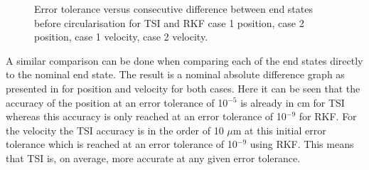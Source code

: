 \begin{figure}[H]
\caption{Error tolerance versus consecutive difference between end states before circularisation for \ac{TSI} and \ac{RKF} \protect{} case 1 position, \protect{} case 2 position, \protect{} case 1 velocity, \protect{} case 2 velocity. } 
\label{fig:errorToleranceVsConsecutiveDifferenceCase1RKFTSIpositionSmall} 
\end{figure} 

\noindent
A similar comparison can be done when comparing each of the end states directly to the nominal end state. The result is a nominal absolute difference graph as presented in  for position and velocity for both cases. Here it can be seen that the accuracy of the position at an error tolerance of 10$^{-5}$ is already in cm for \ac{TSI} whereas this accuracy is only reached at an error tolerance of 10$^{-9}$ for \ac{RKF}. For the velocity the \ac{TSI} accuracy is in the order of 10 $\mu$m at this initial error tolerance which is reached at an error tolerance of 10$^{-9}$ using \ac{RKF}. This means that \ac{TSI} is, on average, more accurate at any given error tolerance.  

